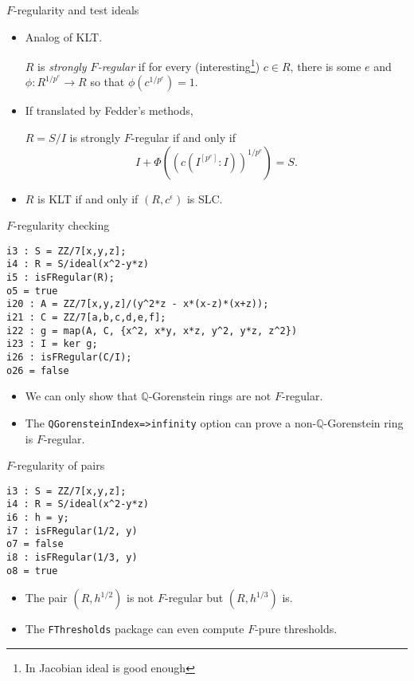 \documentclass[xcolor=dvipsnames]{beamer}
\newcommand{\memph}[1]{{\color{Red}\emph{#1}}}
\newcommand{\bQ}{\mathbb{Q}}
\theoremstyle{remark}
\begin{document}
\begin{frame}[c]{$F$-regularity and test ideals}
  \begin{itemize}
    \item<1->  Analog of KLT.
    \begin{definition}
      $R$ is \memph{strongly $F$-regular} if for every (interesting\footnote{In Jacobian ideal is good enough}) $c \in R$, there is some $e$ and $\phi : R^{1/p^e} \to R$ so that $\phi(c^{1/p^e}) = 1$.
    \end{definition}
    \item<2->  If translated by Fedder's methods,
    \begin{theorem}
      $R = S/I$ is strongly $F$-regular if and only if
      \[
      I + \Phi( (c(I^{[p^e]} : I))^{1/p^e} ) = S.
      \]
    \end{theorem}
    \item<3->  $R$ is KLT if and only if $(R, c^{\epsilon})$ is SLC.
  \end{itemize}
\end{frame}

\begin{frame}[fragile]{$F$-regularity checking}
  \begin{verbatim}
i3 : S = ZZ/7[x,y,z];
i4 : R = S/ideal(x^2-y*z)
i5 : isFRegular(R);
o5 = true
i20 : A = ZZ/7[x,y,z]/(y^2*z - x*(x-z)*(x+z));
i21 : C = ZZ/7[a,b,c,d,e,f];
i22 : g = map(A, C, {x^2, x*y, x*z, y^2, y*z, z^2})
i23 : I = ker g;
i26 : isFRegular(C/I);
o26 = false
  \end{verbatim}
\begin{itemize}
    \item<2->  We can only show that $\bQ$-Gorenstein rings are not $F$-regular.
    \item<3->  The {\tt QGorensteinIndex=>infinity} option can prove a non-$\bQ$-Gorenstein ring is $F$-regular.
\end{itemize}
\end{frame}

\begin{frame}[fragile]{$F$-regularity of pairs}
    \begin{verbatim}
i3 : S = ZZ/7[x,y,z];
i4 : R = S/ideal(x^2-y*z)
i6 : h = y;
i7 : isFRegular(1/2, y)
o7 = false
i8 : isFRegular(1/3, y)
o8 = true
    \end{verbatim}
    \begin{itemize}
\item<2->The pair $(R, h^{1/2})$ is not $F$-regular but $(R, h^{1/3})$ is.
\item<3->The {\tt FThresholds} package can even compute $F$-pure thresholds.
\end{itemize}
\end{frame}
\end{document}
